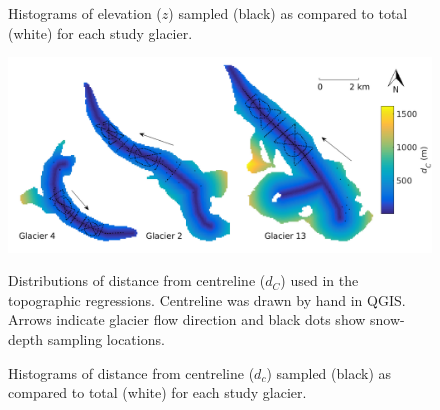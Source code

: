 \documentclass{sfuthesis}
\newcommand{\topomap}{Arrows indicate glacier flow direction and black dots show snow-depth sampling locations. }
\begin{document}
\begin{figure}[H]
	\caption[Histograms of full and sampled elevation ($z$)]{Histograms of elevation ($z$) sampled (black) as compared to total (white) for each study glacier.}
	\label{sampledRange:elev}
\end{figure}

\begin{figure}[H]
	\centering
	\includegraphics[width=\textwidth]{Map_centreD.png}\\
	\caption[Distributions of distance from centreline ($d_C$)]{Distributions of distance from centreline ($d_C$) used in the topographic regressions. Centreline was drawn by hand in QGIS. \topomap}
	\label{map:centreD}
\end{figure}

\begin{figure}[H]
	\caption[Histograms of full and sampled distance from centreline ($d_c$) ]{Histograms of distance from centreline ($d_c$) sampled (black) as compared to total (white) for each study glacier.}
	\label{sampledRange:centreD}
\end{figure}
\end{document}
